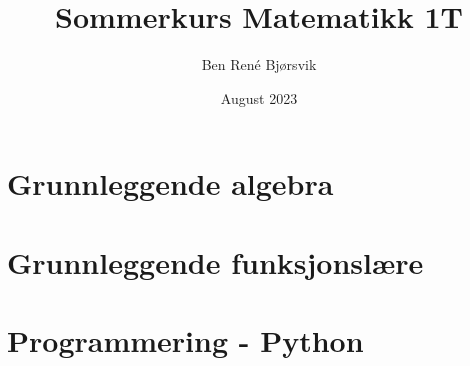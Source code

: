 \documentclass{article}
\title{Sommerkurs Matematikk 1T}
\author{Ben René Bjørsvik}
\date{August 2023}
\begin{document}
\maketitle
\tableofcontents

\section{Grunnleggende algebra}


\section{Grunnleggende funksjonslære}

\section{Programmering - Python}
\end{document}
